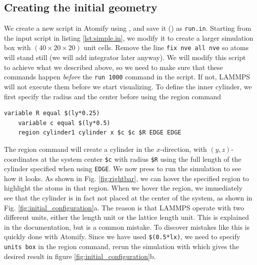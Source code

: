 \documentclass[aps,pre,twocolumn,letterpaper,floatfix,nofootinbib]{revtex4}
\newcommand{\code}[1]{\colorbox{light-gray}{\color{RawSienna}\texttt{#1}}}
\begin{document}
\subsection{Creating the initial geometry}
We create a new script in Atomify using , and save it () as \code{run.in}.
Starting from the input script in listing \ref{lst:simple.in}, we modify it to create a larger simulation box with $(40\times20\times20)$ unit cells.
Remove the line \code{fix nve all nve} so atoms will stand still (we will add integrator later anyway).
We will modify this script to achieve what we described above, so we need to make sure that these commands happen \textit{before} the \code{run 1000} command in the script.
If not, LAMMPS will not execute them before we start visualizing.
To define the inner cylinder, we first specify the radius and the center before using the region command
\begin{lstlisting}[basicstyle=\tiny, frame = none, numbers=none, framexleftmargin=0pt, xleftmargin=-0.75cm, xrightmargin=0.0cm]
	variable R equal $(ly*0.25)
	variable c equal $(ly*0.5)
	region cylinder1 cylinder x $c $c $R EDGE EDGE
\end{lstlisting}
The region command will create a cylinder in the $x$-direction, with $(y,z)$-coordinates at the system center \code{\$c} with radius \code{\$R} using the full length of the cylinder specified when using \code{EDGE}.
We now press  to run the simulation to see how it looks.
As shown in Fig. \ref{fig:rightbar}, we can hover the specified region to highlight the atoms in that region.
When we hover the region, we immediately see that the cylinder is in fact not placed at the center of the system, as shown in Fig. \ref{fig:initial_configuration}a.
The reason is that LAMMPS operate with two different units, either the length unit or the lattice length unit. This is explained in the documentation, but is a common mistake.
To discover mistakes like this is quickly done with Atomify.
Since we have used \code{\$(0.5*lx)}, we need to specify \code{units box} in the region command, rerun the simulation with  which gives the desired result in figure  \ref{fig:initial_configuration}b.
\end{document}
